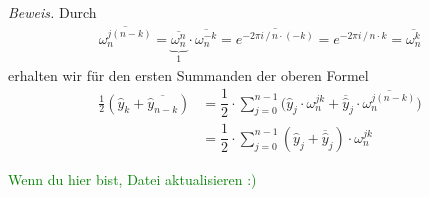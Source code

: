 \textit{Beweis.} 
Durch 
\begin{align*}
  \overline{\omega_n^{j(n-k)}} 
  = \overline{\underbrace{\omega_n^{n}}_{1}} \cdot \overline{\omega_n^{-k}} 
  = \overline{e^{-2\pi i \,/\,n\cdot(-k)}}
  = e^{-2\pi i\,/\,n\cdot k}
  = \overline{\omega_n^k} 
\end{align*}
erhalten wir für den ersten Summanden der oberen Formel
\begin{align*}
  \tfrac{1}{2}(\hat{y}_k + \overline{\hat{y}_{n-k}}) 
  &= \dfrac{1}{2}\cdot\sum_{j=0}^{n-1}\Big(\hat{y}_j\cdot\omega_n^{jk} + \overline{\hat{y}}_j\cdot\overline{\omega_n^{j(n-k)}}\Big) \\
  &= \dfrac{1}{2}\cdot\sum_{j=0}^{n-1}\left(\hat{y}_j+\overline{\hat{y}}_j\right)\cdot\omega_n^{jk}
\end{align*}

\textcolor{green}{Wenn du hier bist, Datei aktualisieren :)}

